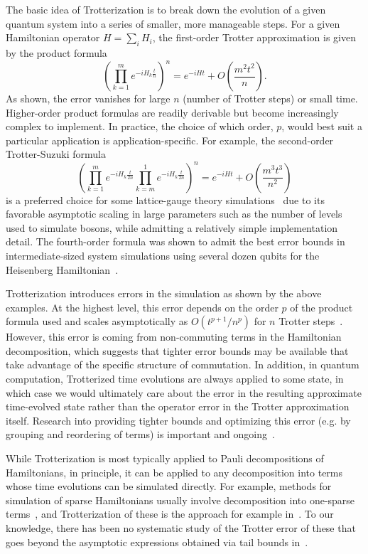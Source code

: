 The basic idea of Trotterization is to break down the evolution of a given quantum system into a series of smaller, more manageable steps. For a given Hamiltonian operator $H=\sum_i H_i$, the first-order Trotter approximation is given by the product formula
\begin{equation}
    \left(\prod_{k=1}^m e^{-iH_k\frac{t}{n}}\right)^n = e^{-iHt} + O\left(\frac{m^2t^2}{n}\right).
\end{equation}
As shown, the error vanishes for large $n$ (number of Trotter steps) or small time.
Higher-order product formulas are readily derivable but become increasingly complex to implement. In practice, the choice of which order, $p$, would best suit a particular application is application-specific.
For example, the second-order Trotter-Suzuki formula
\begin{equation}
\left(\prod_{k=1}^me^{-iH_k\frac{t}{2n}}\prod_{k=m}^1e^{-iH_k\frac{t}{2n}}\right)^n=e^{-iHt}+O\left(\frac{m^3t^3}{n^2}\right)
\end{equation}
is a preferred choice for some lattice-gauge theory simulations~\cite{shangnan2021quantum,kan2022simulating} due to its favorable asymptotic scaling in large parameters such as the number of levels used to simulate bosons, while admitting a relatively simple implementation detail. The fourth-order formula was shown to admit the best error bounds in intermediate-sized system simulations using several dozen qubits for the Heisenberg Hamiltonian~\cite {childs2018toward,nam2019low}.


Trotterization introduces errors in the simulation as shown by the above examples.
At the highest level, this error depends on the order $p$ of the product formula used and scales asymptotically as $O(t^{p+1}/n^p)$ for $n$ Trotter steps~\cite{lloyd1996universal,berry2007efficient}.
However, this error is coming from non-commuting terms in the Hamiltonian decomposition, which suggests that tighter error bounds may be available that take advantage of the specific structure of commutation.
In addition, in quantum computation, Trotterized time evolutions are always applied to some state, in which case we would ultimately care about the error in the resulting approximate time-evolved state rather than the operator error in the Trotter approximation itself.
Research into providing tighter bounds and optimizing this error (e.g. by grouping and reordering of terms) is important and ongoing~\cite{tranter2019ordering,childs2019theory,martinez2trotter}.

While Trotterization is most typically applied to Pauli decompositions of Hamiltonians, in principle, it can be applied to any decomposition into terms whose time evolutions can be simulated directly.
For example, methods for simulation of sparse Hamiltonians usually involve decomposition into one-sparse terms~\cite{berry2007efficient,berry2012black,berry2015hamiltonian,berry2015simulating,berry2019qubitization}, and Trotterization of these is the approach for example in~\cite{berry2007efficient}.
To our knowledge, there has been no systematic study of the Trotter error of these that goes beyond the asymptotic expressions obtained via tail bounds in~\cite{berry2007efficient}.

